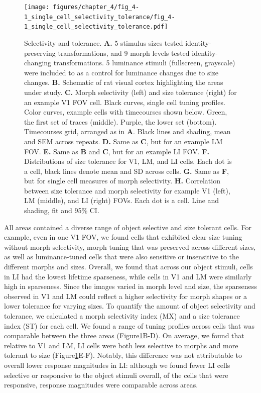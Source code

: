 \begin{figure}[t!]
    \texttt{[image: figures/chapter\_4/fig\_4-1\_single\_cell\_selectivity\_tolerance/fig\_4-1\_single\_cell\_selectivity\_tolerance.pdf]}
    \caption[Single neuron selectivity and tolerance]{Selectivity and tolerance. 
    \textbf{A.} 5 stimulus sizes tested identity-preserving transformations, and 9 morph levels tested identity-changing transformations. 5 luminance stimuli (fullscreen, grayscale) were included to as a control for luminance changes due to size changes. 
    \textbf{B.} Schematic of rat visual cortex highlighting the areas under study. 
    \textbf{C.} Morph selectivity (left) and size tolerance (right) for an example V1 FOV cell. Black curves, single cell tuning profiles. Color curves, example cells with timecourses shown below. Green, the first set of traces (middle). Purple, the lower set (bottom). Timecourses grid, arranged as in \textbf{A}. Black lines and shading, mean and SEM across repeats.
    \textbf{D.} Same as \textbf{C}, but for an example LM FOV.
    \textbf{E.} Same as \textbf{B} and \textbf{C}, but for an example LI FOV.
    \textbf{F.} Distributions of size tolerance for V1, LM, and LI cells. Each dot is a cell, black lines denote mean and SD across cells.
    \textbf{G.} Same as \textbf{F}, but for single cell measures of morph selectivity. 
    \textbf{H.} Correlation between size tolerance and morph selectivity for example V1 (left), LM (middle), and LI (right) FOVs. Each dot is a cell. Line and shading, fit and 95\% CI.
    \label{fig:selectivity_tolerance}}
\end{figure}

All areas contained a diverse range of object selective and size tolerant cells. For example, even in one V1 FOV, we found cells that exhibited clear size tuning without morph selectivity, morph tuning that was preserved across different sizes, as well as luminance-tuned cells that were also sensitive or insensitive to the different morphs and sizes. Overall, we found that across our object stimuli, cells in LI had the lowest lifetime sparseness, while cells in V1 and LM were similarly high in sparseness. Since the images varied in morph level and size, the sparseness observed in V1 and LM could reflect a higher selectivity for morph shapes or a lower tolerance for varying sizes. To quantify the amount of object selectivity and tolerance, we calculated a morph selectivity index (MX) and a size tolerance index (ST) for each cell\cite{Zoccolan2007}. We found a range of tuning profiles across cells that was comparable between the three areas (Figure\ref{fig:selectivity_tolerance}B-D). On average, we found that relative to V1 and LM, LI cells were both less selective to morphs and more tolerant to size (Figure\ref{fig:selectivity_tolerance}E-F). Notably, this difference was not attributable to overall lower response magnitudes in LI: although we found fewer LI cells selective or responsive to the object stimuli overall, of the cells that were responsive, response magnitudes were comparable across areas. 

